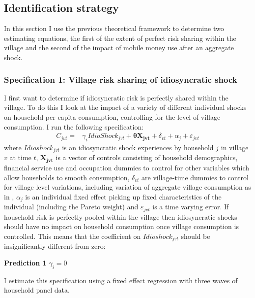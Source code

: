 \clearpage
\subsection{Identification strategy} 
In this section I use the previous theoretical framework to determine two estimating equations, the first of the extent of perfect risk sharing within the village and the second of the impact of mobile money use after an aggregate shock. 

\subsubsection{Specification 1: Village risk sharing of idiosyncratic shock}
I first want to determine if idiosyncratic risk is perfectly shared within the village. To do this I look at the impact of a variety of different individual shocks on household per capita consumption, controlling for the level of village consumption. I run the following specification: 
\begin{align} \label{eq: idioshock}
C_{jvt} = &   \gamma_i IdioShock_{jvt}  + \bm{\theta X_{jvt}}   +  \delta_{vt} + \alpha_j + \varepsilon_{jvt} 
\end{align}
where $Idioshock_{jvt}$ is an idiosyncratic shock experiences by household $j$ in village $v$ at time $t$,  $\bm{X_{jvt}}$ is a vector of controls consisting of household demographics, financial service use and occupation dummies to control for other variables which allow households to smooth consumption, $\delta_{vt}$ are village-time dummies to control for village level variations, including variation of aggregate village consumption as in \cite{ravallion1997risk}, $\alpha_j$ is an individual fixed effect picking up fixed characteristics of the individual (including the Pareto weight) and $\varepsilon_{jvt}$ is a time varying error. If household risk is perfectly pooled within the village then idiosyncratic shocks should have no impact on household consumption once village consumption is controlled. This means that the coefficient on $Idioshock_{jvt}$ should be insignificantly different from zero: 
\begin{description}
\item{\bf{Prediction 1}} $\gamma_i=0$
\end{description}

I estimate this specification using a fixed effect regression with three waves of household panel data.

